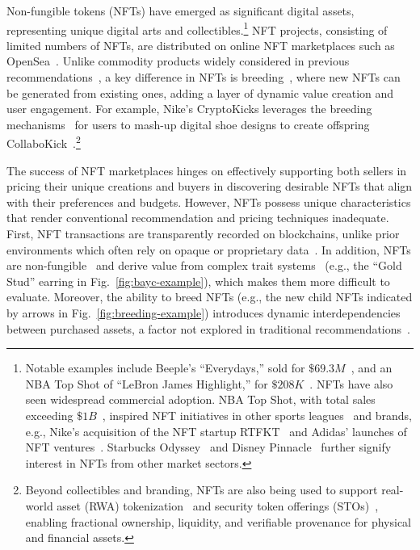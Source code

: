 \documentclass[conference]{IEEEtran}
\theoremstyle{plain}
\begin{document}
Non-fungible tokens (NFTs) have emerged as significant digital assets, representing unique digital arts and collectibles.\footnote{Notable examples include Beeple's ``Everydays,'' sold for $\$69.3M$~\cite{beeple2021}, and an NBA Top Shot of ``LeBron James Highlight,'' for $\$208K$~\cite{nbatopshot}. NFTs have also seen widespread commercial adoption. NBA Top Shot, with total sales exceeding $\$1B$~\cite{topshot1b}, inspired NFT initiatives in other sports leagues~\cite{nflallday, ufcstrike, nhlbreakaway} and brands, e.g., Nike's acquisition of the NFT startup RTFKT~\cite{nike2021acquiresrtfkt}  and Adidas' launches of NFT ventures~\cite{adidasalts}. Starbucks Odyssey~\cite{starbucks2022odyssey} and Disney Pinnacle~\cite{yahoo2023disneydapperlabs} further signify interest in NFTs from other market sectors.} NFT projects, consisting of limited numbers of NFTs, are distributed on online NFT marketplaces such as OpenSea~\cite{opensea}. Unlike commodity products widely considered in previous recommendations~\cite{he2020lightgcn, yang2021consisrec}, a key difference in NFTs is breeding~\cite{wu2023critical, sawhney2023nike}, where new NFTs can be generated from existing ones, adding a layer of dynamic value creation and user engagement. For example, Nike's CryptoKicks leverages the breeding mechanisms~\cite{sawhney2023nike} for users to mash-up digital shoe designs to create offspring CollaboKick~\cite{nftnyc2020nike}.\footnote{Beyond collectibles and branding, NFTs are also being used to support real-world asset (RWA) tokenization~\cite{notheisen2017trading} and security token offerings (STOs)~\cite{kreppmeier2023real}, enabling fractional ownership, liquidity, and verifiable provenance for physical and financial assets.}

    The success of NFT marketplaces hinges on effectively supporting both sellers in pricing their unique creations and buyers in discovering desirable NFTs that align with their preferences and budgets. However, NFTs possess unique characteristics that render conventional recommendation and pricing techniques inadequate. First, NFT transactions are transparently recorded on blockchains, unlike prior environments which often rely on opaque or proprietary data~\cite{kraussl2024non}. In addition, NFTs are non-fungible~\cite{das2022understanding} and derive value from complex trait systems~\cite{mekacher2022heterogeneous} (e.g., the ``Gold Stud'' earring in Fig.~\ref{fig:bayc-example}), which makes them more difficult to evaluate. Moreover, the ability to breed NFTs (e.g., the new child NFTs indicated by arrows in Fig.~\ref{fig:breeding-example}) introduces dynamic interdependencies between purchased assets, a factor not explored in traditional recommendations~\cite{he2020lightgcn, yang2021consisrec, chang2020bundle, cao2018attentive}. 
\end{document}
